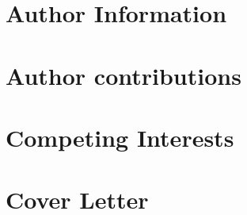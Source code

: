 \documentclass[11pt, titlepage]{article}
\begin{document}
\section{Author Information}
\label{MPSection:123E0EEB-7ABB-4C14-B34C-6522D2121C22}



\section{Author contributions}
\label{MPSection:3FAE3F54-6E70-4989-980C-B04D76E149C9}



\section{Competing Interests}
\label{MPSection:1145FB34-722E-4F10-A9BD-1294B2C92B95}



\section{Cover Letter}
\label{MPSection:5F51E60F-C38F-4DB9-B5FD-427AEE97C7A8}
\end{document}
